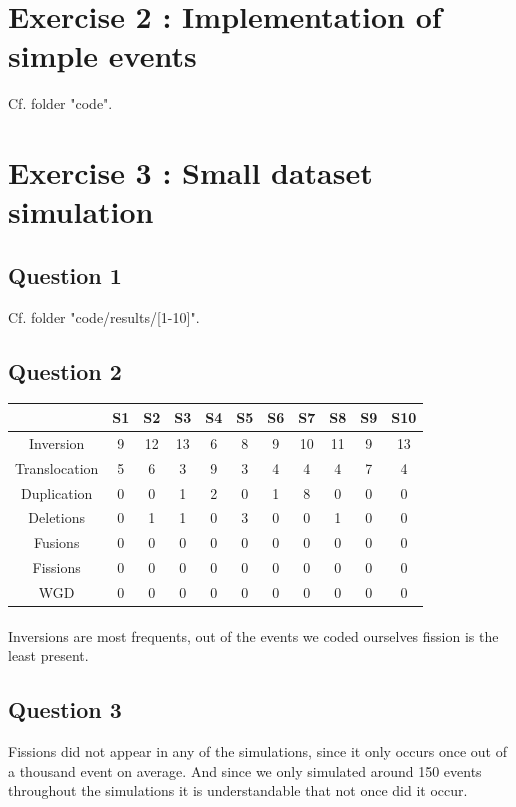 \documentclass[]{article}
\theoremstyle{definition}
\begin{document}
\section{Exercise 2 : Implementation of simple events}
Cf. folder "code".

\section{Exercise 3 : Small dataset simulation}
\subsection{Question 1}

Cf. folder "code/results/[1-10]".

\subsection{Question 2}
\begin{center}
\begin{tabular}{|*{11}{c|}}
	\hline
	& S1& S2  & S3  & S4 & S5
	& S6& S7 & S8 & S9 & S10 \\
	\hline
	Inversion     &9 &12&13&6 &8 &9 &10&11&9 &13 \\
	\hline
	Translocation &5 &6 &3 &9 &3 &4 &4 &4 &7 &4 \\
	\hline
	Duplication   &0 &0 &1 &2 &0 &1 &8 &0 &0 &0 \\
	\hline
	Deletions     &0 &1 &1 &0 &3 &0 &0 &1 &0 &0 \\
	\hline
	Fusions       &0 &0 &0 &0 &0 &0 &0 &0 &0 &0 \\
	\hline
	Fissions      &0 &0 &0 &0 &0 &0 &0 &0 &0 &0 \\
	\hline
	WGD           &0 &0 &0 &0 &0 &0 &0 &0 &0 &0 \\
	\hline
\end{tabular}
\end{center}
\paragraph*{}
Inversions are most frequents, out of the events we coded ourselves fission is the least present.

\subsection{Question 3}
Fissions did not appear in any of the simulations, since it only occurs once out of a thousand event on average. And since we only simulated around 150 events throughout the simulations it is understandable that not once did it occur.
\end{document}
